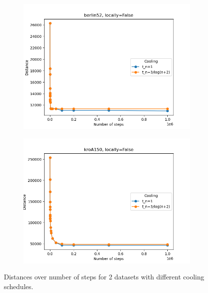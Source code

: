\begin{figure}[!htb]
	\centering
	\begin{subfigure}{0.45\textwidth}
		\includegraphics[width=\textwidth]{img/berlin52_annealing_locally=False}
	\end{subfigure}
	\begin{subfigure}{0.45\textwidth}
		\includegraphics[width=\textwidth]{img/kroA150_annealing_locally=False}
	\end{subfigure}
	\caption{Distances over number of steps for 2 datasets with different cooling schedules.}
	\label{fig:annealing_1}
\end{figure}

